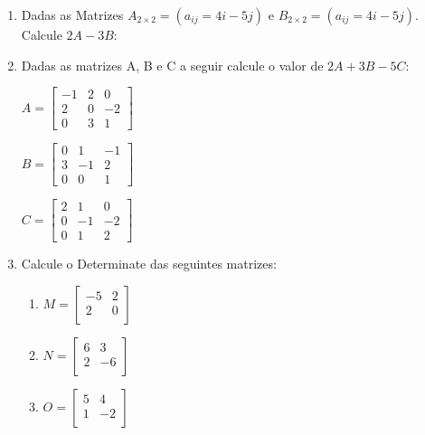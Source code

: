 \documentclass[oneside,a4paper,10pt]{article}
\newcommand{\PC}[1]{\ensuremath{\left(#1\right)}}
\begin{document}
\begin{enumerate}
\item Dadas as Matrizes $A_{2 \times 2}=\PC{a_{ij}=4i-5j}$ e $B_{2 \times 2}=\PC{a_{ij}=4i-5j}$. Calcule $ 2A - 3B$:
			
\item Dadas as matrizes	A, B e C a seguir calcule o valor de $2A + 3B - 5C$:
\begin{multicols}{3}
		$ A = \left[		
		\begin{array}{ccc}
		-1   & 2    & 0  \\
		2  & 0      & -2 \\
		0   & 3 & 1
		\end{array}
		\right] $
				
		$ B = \left[
		\begin{array}{ccc}
		0   & 1    & -1  \\
		3  & -1      & 2 \\
		0   & 0 & 1
		\end{array}
		\right] $
				
		$ C = \left[		
		\begin{array}{ccc}
		2	& 1    & 0  \\
		0  & -1      & -2 \\
		0   & 1		& 	2
		\end{array}
		\right] $		
\end{multicols}
		
\item Calcule o Determinate das seguintes matrizes:
\begin{multicols}{4}
\begin{enumerate}
 
\item	$ M = \left[		
		\begin{array}{cc}
		-5   & 2  \\
		2  & 0   \\		
		\end{array}
		\right] $
				
\item	$ N = \left[		
		\begin{array}{cc}
		6   & 3  \\
		2  & -6   \\		
		\end{array}
		\right] $
				
\item 	$ O = \left[		
		\begin{array}{cc}
		5   & 4  \\
		1  & -2 \\		
		\end{array}
		\right] $
		

\end{enumerate}
\end{multicols}
\end{enumerate}
\end{document}
